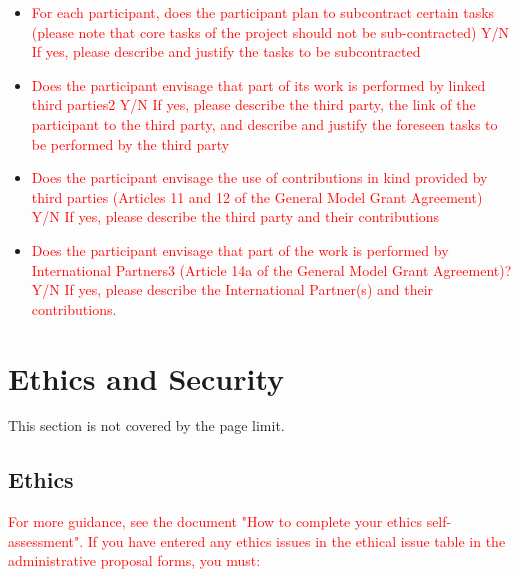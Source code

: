 \documentclass[12pt, a4paper]{article} %
\begin{document}
\begin{itemize}
\item \textcolor{red}{For each participant, does the participant plan
    to subcontract certain tasks (please note that core tasks of the
    project should not be sub-contracted) Y/N If yes, please describe
    and justify the tasks to be subcontracted}
\item \textcolor{red}{Does the participant envisage that part of its
    work is performed by linked third parties2 Y/N If yes, please
    describe the third party, the link of the participant to the third
    party, and describe and justify the foreseen tasks to be performed
    by the third party}
\item \textcolor{red}{Does the participant envisage the use of
    contributions in kind provided by third parties (Articles 11 and
    12 of the General Model Grant Agreement) Y/N If yes, please
    describe the third party and their contributions}
\item \textcolor{red}{Does the participant envisage that part of the
    work is performed by International Partners3 (Article 14a of the
    General Model Grant Agreement)?  Y/N If yes, please describe the
    International Partner(s) and their contributions.}
\end{itemize}


\section{Ethics and Security}

 This section is not covered by the page limit.

\subsection{Ethics}


\textcolor{red}{ For more guidance, see the document "How to complete
  your ethics self-assessment".  If you have entered any ethics issues
  in the ethical issue table in the administrative proposal forms, you
  must:}
\end{document}
